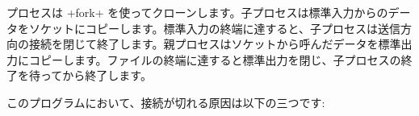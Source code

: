 プロセスは \ml+fork+ を使ってクローンします。子プロセスは標準入力からのデータをソケットにコピーします。標準入力の終端に達すると、子プロセスは送信方向の接続を閉じて終了します。親プロセスはソケットから呼んだデータを標準出力にコピーします。ファイルの終端に達すると標準出力を閉じ、子プロセスの終了を待ってから終了します。

このプログラムにおいて、接続が切れる原因は以下の三つです:

